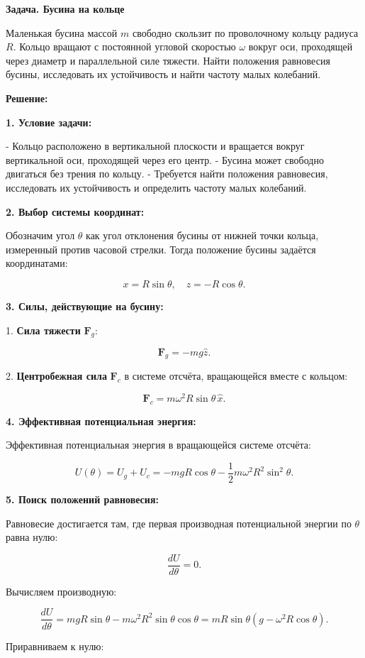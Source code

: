 \documentclass{article}
\begin{document}
\textbf{Задача. Бусина на кольце}

Маленькая бусина массой \( m \) свободно скользит по проволочному кольцу радиуса \( R \). Кольцо вращают с постоянной угловой скоростью \( \omega \) вокруг оси, проходящей через диаметр и параллельной силе тяжести. Найти положения равновесия бусины, исследовать их устойчивость и найти частоту малых колебаний.

\textbf{Решение:}

\textbf{1. Условие задачи:}

- Кольцо расположено в вертикальной плоскости и вращается вокруг вертикальной оси, проходящей через его центр.
- Бусина может свободно двигаться без трения по кольцу.
- Требуется найти положения равновесия, исследовать их устойчивость и определить частоту малых колебаний.

\textbf{2. Выбор системы координат:}

Обозначим угол \(\theta\) как угол отклонения бусины от нижней точки кольца, измеренный против часовой стрелки. Тогда положение бусины задаётся координатами:

\[
x = R \sin \theta, \quad z = -R \cos \theta.
\]

\textbf{3. Силы, действующие на бусину:}

1. \textbf{Сила тяжести} \( \mathbf{F}_g \):

\[
\mathbf{F}_g = -mg \hat{z}.
\]

2. \textbf{Центробежная сила} \( \mathbf{F}_c \) в системе отсчёта, вращающейся вместе с кольцом:

\[
\mathbf{F}_c = m \omega^2 R \sin \theta \, \hat{x}.
\]

\textbf{4. Эффективная потенциальная энергия:}

Эффективная потенциальная энергия в вращающейся системе отсчёта:

\[
U(\theta) = U_g + U_c = -mgR \cos \theta - \dfrac{1}{2} m \omega^2 R^2 \sin^2 \theta.
\]

\textbf{5. Поиск положений равновесия:}

Равновесие достигается там, где первая производная потенциальной энергии по \(\theta\) равна нулю:

\[
\dfrac{dU}{d\theta} = 0.
\]

Вычисляем производную:

\[
\dfrac{dU}{d\theta} = mgR \sin \theta - m \omega^2 R^2 \sin \theta \cos \theta = mR \sin \theta \left( g - \omega^2 R \cos \theta \right).
\]

Приравниваем к нулю:
\end{document}
